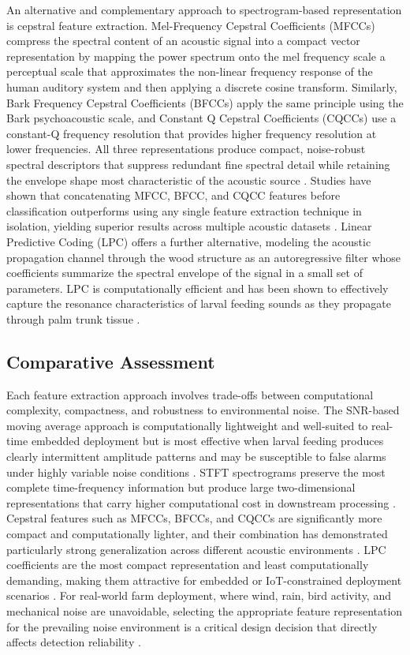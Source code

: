 \documentclass[12pt,a4paper,oneside]{memoir}
\begin{document}
An alternative and complementary approach to spectrogram-based representation is cepstral feature extraction. Mel-Frequency Cepstral Coefficients (MFCCs) compress the spectral content of an acoustic signal into a compact vector representation by mapping the power spectrum onto the mel frequency scale a perceptual scale that approximates the non-linear frequency response of the human auditory system and then applying a discrete cosine transform. Similarly, Bark Frequency Cepstral Coefficients (BFCCs) apply the same principle using the Bark psychoacoustic scale, and Constant Q Cepstral Coefficients (CQCCs) use a constant-Q frequency resolution that provides higher frequency resolution at lower frequencies. All three representations produce compact, noise-robust spectral descriptors that suppress redundant fine spectral detail while retaining the envelope shape most characteristic of the acoustic source \cite{pinhas2008,rach2013,boulila2023}. Studies have shown that concatenating MFCC, BFCC, and CQCC features before classification outperforms using any single feature extraction technique in isolation, yielding superior results across multiple acoustic datasets \cite{boulila2023}. Linear Predictive Coding (LPC) offers a further alternative, modeling the acoustic propagation channel through the wood structure as an autoregressive filter whose coefficients summarize the spectral envelope of the signal in a small set of parameters. LPC is computationally efficient and has been shown to effectively capture the resonance characteristics of larval feeding sounds as they propagate through palm trunk tissue \cite{saranya2025}.

\subsection{Comparative Assessment}

Each feature extraction approach involves trade-offs between computational complexity, compactness, and robustness to environmental noise. The SNR-based moving average approach is computationally lightweight and well-suited to real-time embedded deployment but is most effective when larval feeding produces clearly intermittent amplitude patterns and may be susceptible to false alarms under highly variable noise conditions \cite{wang2021}. STFT spectrograms preserve the most complete time-frequency information but produce large two-dimensional representations that carry higher computational cost in downstream processing \cite{boulila2023}. Cepstral features such as MFCCs, BFCCs, and CQCCs are significantly more compact and computationally lighter, and their combination has demonstrated particularly strong generalization across different acoustic environments \cite{boulila2023}. LPC coefficients are the most compact representation and least computationally demanding, making them attractive for embedded or IoT-constrained deployment scenarios \cite{saranya2025}. For real-world farm deployment, where wind, rain, bird activity, and mechanical noise are unavoidable, selecting the appropriate feature representation for the prevailing noise environment is a critical design decision that directly affects detection reliability \cite{pinhas2008,rach2013,saranya2025}.
\end{document}
